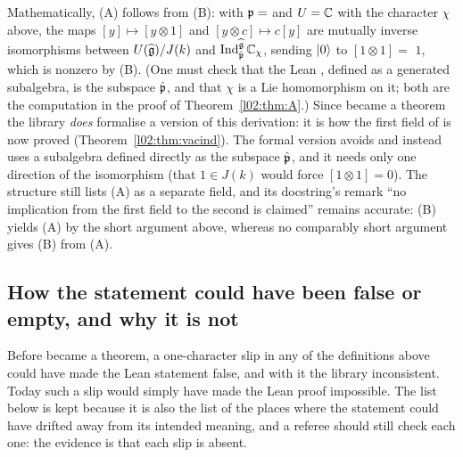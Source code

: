 \begin{remark}\label{l02:rem:AfromB}
Mathematically, (A) follows from (B): with $\mathfrak{p} = $  and $U = {\mathbb{C}}$ with the character
$\chi$ above, the maps $[y]\mapsto[y\otimes1]$ and $[y\otimes c]\mapsto c[y]$ are mutually inverse
isomorphisms between $U(\widehat{\mathfrak{g}})/J(k)$ and $\operatorname{Ind}_{\hat{\mathfrak{p}}}^{\widehat{\mathfrak{g}}}{\mathbb{C}}_\chi$, sending $|0\rangle$ to
$[1\otimes1] = $  $1$, which is nonzero by (B). (One must check that the Lean
, defined as a generated subalgebra, is the subspace $\hat{\mathfrak{p}}$, and that $\chi$ is a
Lie homomorphism on it; both are the computation in the proof of Theorem~\ref{l02:thm:A}.) Since
 became a theorem the library \emph{does} formalise a version of this derivation: it is how the
first field of  is now proved (Theorem~\ref{l02:thm:vacind}). The formal version avoids
 and instead uses a subalgebra  defined directly as the subspace
$\hat{\mathfrak{p}}$, and it needs only one direction of the isomorphism (that $1\in J(k)$ would force
$[1\otimes1] = 0$). The structure  still lists (A) as a separate field, and its
docstring's remark ``no implication from the first field to the second is claimed'' remains accurate:
(B) yields (A) by the short argument above, whereas no comparably short argument gives (B) from (A).
\end{remark}

\subsection{How the statement could have been false or empty, and why it is not}

Before  became a theorem, a one-character slip in any of the definitions above could have made the
Lean statement false, and with it the library inconsistent. Today such a slip would simply have made the
Lean proof impossible. The list below is kept because it is also the list of the places where the
statement could have drifted away from its intended meaning, and a referee should still check each one:
the evidence is that each slip is absent.

